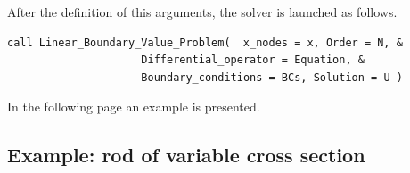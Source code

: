 After the definition of this arguments, the solver is launched as follows. \\

\begin{blueframed}
\begin{lstlisting}
call Linear_Boundary_Value_Problem(  x_nodes = x, Order = N, &
                     Differential_operator = Equation, &
                     Boundary_conditions = BCs, Solution = U )

\end{lstlisting}
\end{blueframed}

In the following page an example is presented.\\


\newpage
\subsection*{Example: rod of variable cross section}

